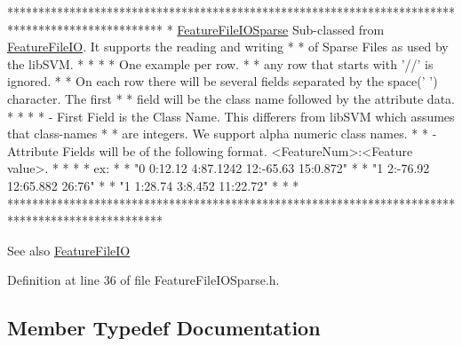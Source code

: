 \begin{DoxyCode}
*************************************************************************************************
*  \hyperlink{class_k_k_m_l_l_1_1_feature_file_i_o_sparse_ad36778501bcc67859ab14717992ae7c3}{FeatureFileIOSparse}  Sub-classed from \hyperlink{class_k_k_m_l_l_1_1_feature_file_i_o_a820170380cfca6a036a29d2c51b8441a}{FeatureFileIO}.  It supports the 
      reading and writing    *
*  of Sparse Files as used by the libSVM.                                                       *
*                                                                                               *
*  One example per row.                                                                         *
*  any row that starts with \textcolor{stringliteral}{'//'} is ignored.                                                    *
*  On each row there will be several fields separated by the space(\textcolor{charliteral}{' '}) character. The first    *
*  field will be the class name followed by the attribute data.                                 *
*                                                                                               *
*   - First Field is the Class Name.  This differers from libSVM which assumes that class-names *
*     are integers.  We support alpha numeric class names.                                      *
*   - Attribute Fields will be of the following format.  <FeatureNum>:<Feature value>.          *
*                                                                                               *
*  ex:                                                                                          *
*     "0 0:12.12 4:87.1242 12:-65.63 15:0.872"                                                  *
*     "1 2:-76.92 12:65.882 26:76"                                                              *
*     "1 1:28.74 3:8.452 11:22.72"                                                              *
*                                                                                               *
*************************************************************************************************
\end{DoxyCode}
 \begin{DoxySeeAlso}{See also}
\hyperlink{class_k_k_m_l_l_1_1_feature_file_i_o}{Feature\+File\+IO} 
\end{DoxySeeAlso}


Definition at line 36 of file Feature\+File\+I\+O\+Sparse.\+h.



\subsection{Member Typedef Documentation}
